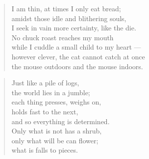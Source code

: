 \newpage


\vspace*{-15mm}
\centeredornament





\begin{verse}
  I am thin, at times I only eat bread; \\
  amidst those idle and blithering souls, \\
  I seek in vain more certainty, like the die. \\
  No chuck roast reaches my mouth \\
  while I cuddle a small child to my heart --- \\
  however clever, the cat cannot catch at once \\
  the mouse outdoors and the mouse indoors.
\end{verse}

\bigskip




\begin{verse}
  Just like a pile of logs, \\
  the world lies in a jumble; \\
  each thing presses, weighs on, \\
  holds fast to the next, \\
  and so everything is determined. \\
  Only what is not has a shrub, \\
  only what will be can flower; \\
  what is falls to pieces.
\end{verse}

